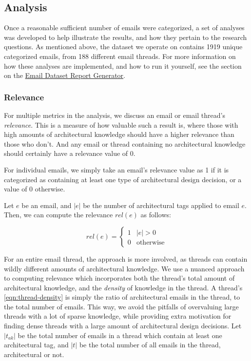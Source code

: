 \documentclass[a4paper, 12pt]{article}
\begin{document}
	\newpage
	\subsection{Analysis}
		Once a reasonable sufficient number of emails were categorized, a set of analyses was developed to help illustrate the results, and how they pertain to the research questions. As mentioned above, the dataset we operate on contains 1919 unique categorized emails, from 188 different email threads. For more information on how these analyses are implemented, and how to run it yourself, see the section on the \hyperref[sec:email-dataset-report-generator]{Email Dataset Report Generator}.
		
		\subsubsection{Relevance}
			For multiple metrics in the analysis, we discuss an email or email thread's \textit{relevance}. This is a measure of how valuable such a result is, where those with high amounts of architectural knowledge should have a higher relevance than those who don't. And any email or thread containing no architectural knowledge should certainly have a relevance value of 0.
			
			For individual emails, we simply take an email's relevance value as 1 if it is categorized as containing at least one type of architectural design decision, or a value of 0 otherwise.
			
			Let $ e $ be an email, and $ |e| $ be the number of architectural tags applied to email $ e $. Then, we can compute the relevance $ rel(e) $ as follows:
			
			\begin{equation}
				\tag{Email Relevance}
				rel(e) =
				\begin{cases}
					1 & |e| > 0 \\
					0 & \text{otherwise}
				\end{cases}
				\label{eqn:email-relevance}
			\end{equation}
		
			For an entire email thread, the approach is more involved, as threads can contain wildly different amounts of architectural knowledge. We use a nuanced approach to computing relevance which incorporates both the thread's total amount of architectural knowledge, and the \textit{density} of knowledge in the thread. A thread's \eqref{eqn:thread-density} is simply the ratio of architectural emails in the thread, to the total number of emails. This way, we avoid the pitfalls of overvaluing large threads with a lot of sparse knowledge, while providing extra motivation for finding dense threads with a large amount of architectural design decisions. Let $ |t_{ak}| $ be the total number of emails in a thread which contain at least one architectural tag, and $ |t| $ be the total number of all emails in the thread, architectural or not.
			
\end{document}
